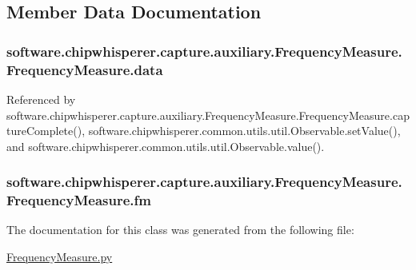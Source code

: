\subsection{Member Data Documentation}
\hypertarget{classsoftware_1_1chipwhisperer_1_1capture_1_1auxiliary_1_1FrequencyMeasure_1_1FrequencyMeasure_af026efe71f339dac13f9890cfaf18bf6}{}
\subsubsection[{data}]{\setlength{\rightskip}{0pt plus 5cm}software.\+chipwhisperer.\+capture.\+auxiliary.\+Frequency\+Measure.\+Frequency\+Measure.\+data}\label{classsoftware_1_1chipwhisperer_1_1capture_1_1auxiliary_1_1FrequencyMeasure_1_1FrequencyMeasure_af026efe71f339dac13f9890cfaf18bf6}


Referenced by software.\+chipwhisperer.\+capture.\+auxiliary.\+Frequency\+Measure.\+Frequency\+Measure.\+capture\+Complete(), software.\+chipwhisperer.\+common.\+utils.\+util.\+Observable.\+set\+Value(), and software.\+chipwhisperer.\+common.\+utils.\+util.\+Observable.\+value().

\hypertarget{classsoftware_1_1chipwhisperer_1_1capture_1_1auxiliary_1_1FrequencyMeasure_1_1FrequencyMeasure_a6473831ba85318d9286b9554341f15b0}{}
\subsubsection[{fm}]{\setlength{\rightskip}{0pt plus 5cm}software.\+chipwhisperer.\+capture.\+auxiliary.\+Frequency\+Measure.\+Frequency\+Measure.\+fm}\label{classsoftware_1_1chipwhisperer_1_1capture_1_1auxiliary_1_1FrequencyMeasure_1_1FrequencyMeasure_a6473831ba85318d9286b9554341f15b0}


The documentation for this class was generated from the following file\+:\begin{DoxyCompactItemize}
\item 
\hyperlink{FrequencyMeasure_8py}{Frequency\+Measure.\+py}\end{DoxyCompactItemize}
